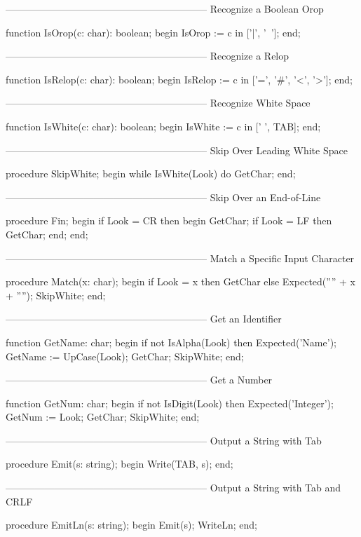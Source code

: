 \documentclass[float=false, crop=false]{standalone}
\begin{document}
{--------------------------------------------------------------}
{ Recognize a Boolean Orop }

function IsOrop(c: char): boolean;
begin
   IsOrop := c in ['|', '~'];
end;


{--------------------------------------------------------------}
{ Recognize a Relop }

function IsRelop(c: char): boolean;
begin
   IsRelop := c in ['=', '#', '<', '>'];
end;


{--------------------------------------------------------------}
{ Recognize White Space }

function IsWhite(c: char): boolean;
begin
   IsWhite := c in [' ', TAB];
end;


{--------------------------------------------------------------}
{ Skip Over Leading White Space }

procedure SkipWhite;
begin
   while IsWhite(Look) do
      GetChar;
end;


{--------------------------------------------------------------}
{ Skip Over an End-of-Line }

procedure Fin;
begin
   if Look = CR then begin
      GetChar;
      if Look = LF then
         GetChar;
   end;
end;


{--------------------------------------------------------------}
{ Match a Specific Input Character }

procedure Match(x: char);
begin
   if Look = x then GetChar
   else Expected('''' + x + '''');
   SkipWhite;
end;


{--------------------------------------------------------------}
{ Get an Identifier }

function GetName: char;
begin
   if not IsAlpha(Look) then Expected('Name');
   GetName := UpCase(Look);
   GetChar;
   SkipWhite;
end;


{--------------------------------------------------------------}
{ Get a Number }

function GetNum: char;
begin
   if not IsDigit(Look) then Expected('Integer');
   GetNum := Look;
   GetChar;
   SkipWhite;
end;


{--------------------------------------------------------------}
{ Output a String with Tab }

procedure Emit(s: string);
begin
   Write(TAB, s);
end;


{--------------------------------------------------------------}
{ Output a String with Tab and CRLF }

procedure EmitLn(s: string);
begin
   Emit(s);
   WriteLn;
end;
\end{document}
